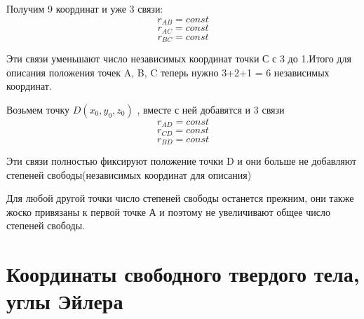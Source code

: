 Получим 9 координат и уже 3 связи:
\[r_{AB} = const\]
\[r_{AC} = const\]
\[r_{BC} = const\]

Эти связи уменьшают число независимых координат точки С с 3 до 1.Итого для описания положения точек A, B, C теперь нужно 3+2+1 = 6 независимых координат.

Возьмем точку $D(x_0,y_0,z_0)$ , вместе с ней добавятся и 3 связи
\[ r_{AD} = const\]
\[ r_{CD} = const\]
\[ r_{BD} = const\]

Эти связи полностью фиксируют положение точки D и они больше не добавляют степеней свободы(независимых координат для описания)

Для любой другой точки число степеней свободы останется прежним, они также жоско привязаны к первой точке А и поэтому не увеличивают общее число степеней свободы.

\section{Координаты свободного твердого тела, углы Эйлера}



